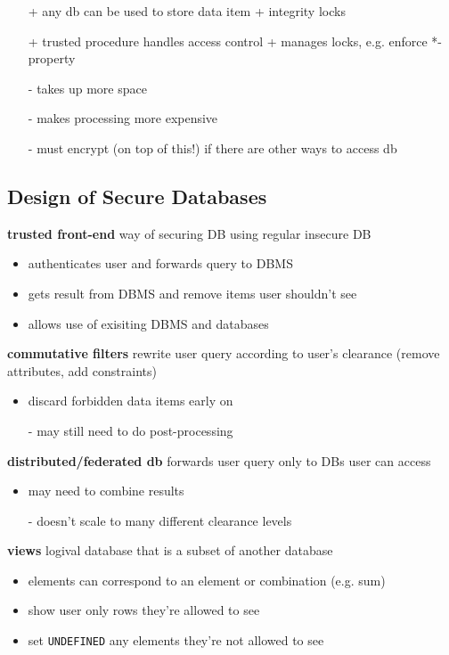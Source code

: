 \documentclass[]{article}
\theoremstyle{definition}
\begin{document}
	\begin{itemize}
		\item[+] any db can be used to store data item + integrity locks
		\item[+] trusted procedure handles access control + manages locks, e.g. enforce *-property
		\item[-] takes up more space
		\item[-] makes processing more expensive
		\item[-] must encrypt (on top of this!) if there are other ways to access db
	\end{itemize}


	\subsection{Design of Secure Databases}
	\textbf{trusted front-end} way of securing DB using regular insecure DB
	\begin{itemize}
		\item authenticates user and forwards query to DBMS
		\item gets result from DBMS and remove items user shouldn't see
		\item allows use of exisiting DBMS and databases
	\end{itemize}

	\textbf{commutative filters} rewrite user query according to user's clearance (remove attributes, add constraints)
	\begin{itemize}
		\item discard forbidden data items early on
		\item[-] may still need to do post-processing
	\end{itemize}

	\textbf{distributed/federated db} forwards user query only to DBs user can access
	\begin{itemize}
		\item may need to combine results
		\item[-] doesn't scale to many different clearance levels
	\end{itemize}

	\textbf{views} logival database that is a subset of another database
	\begin{itemize}
		\item elements can correspond to an element or combination (e.g. sum)
		\item show user only rows they're allowed to see
		\item set \texttt{UNDEFINED} any elements they're not allowed to see
	\end{itemize}
\end{document}
